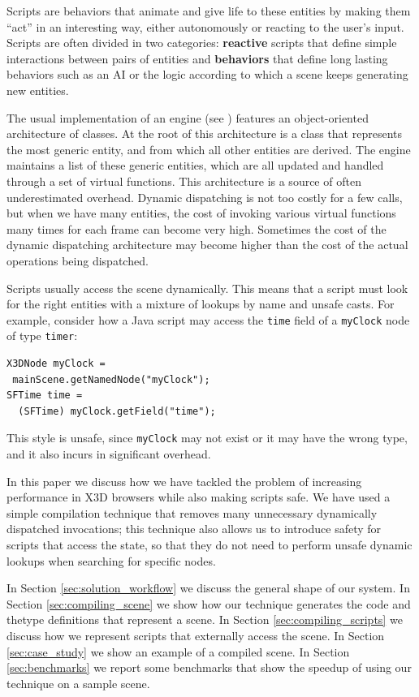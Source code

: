 Scripts are behaviors that animate and give life to these entities by making them ``act'' in an interesting way, either autonomously or reacting to the user's input. Scripts are often divided in two categories: \textbf{reactive} scripts that define simple interactions between pairs of entities and \textbf{behaviors} that define long lasting behaviors such as an AI or the logic according to which a scene keeps generating new entities.

The usual implementation of an engine (see \cite{GAME_OO_HIERARCHY}) features an object-oriented architecture of classes. At the root of this architecture is a class that represents the most generic entity, and from which all other entities are derived. The engine maintains a list of these generic entities, which are all updated and handled through a set of virtual functions. This architecture is a source of often underestimated overhead. Dynamic dispatching is not too costly for a few calls, but when we have many entities, the cost of invoking various virtual functions many times for each frame can become very high. Sometimes the cost of the dynamic dispatching architecture may become higher than the cost of the actual operations being dispatched.

Scripts usually access the scene dynamically. This means that a script must look for the right entities with a mixture of lookups by name and unsafe casts. For example, consider how a Java script may access the \texttt{time} field of a \texttt{myClock} node of type \texttt{timer}:

\begin{lstlisting}
X3DNode myClock = 
 mainScene.getNamedNode("myClock");
SFTime time = 
  (SFTime) myClock.getField("time");
\end{lstlisting}

This style is unsafe, since \texttt{myClock} may not exist or it may have the wrong type, and it also incurs in significant overhead.

In this paper we discuss how we have tackled the problem of increasing performance in X3D browsers while also making scripts safe. We have used a simple compilation technique that removes many unnecessary dynamically dispatched invocations; this technique also allows us to introduce safety for scripts that access the state, so that they do not need to perform unsafe dynamic lookups when searching for specific nodes.

In Section \ref{sec:solution_workflow} we discuss the general shape of our system. In Section \ref{sec:compiling_scene} we show how our technique generates the code and thetype definitions that represent a scene. In Section \ref{sec:compiling_scripts} we discuss how we represent scripts that externally access the scene. In Section \ref{sec:case_study} we show an example of a compiled scene. In Section \ref{sec:benchmarks} we report some benchmarks that show the speedup of using our technique on a sample scene.

